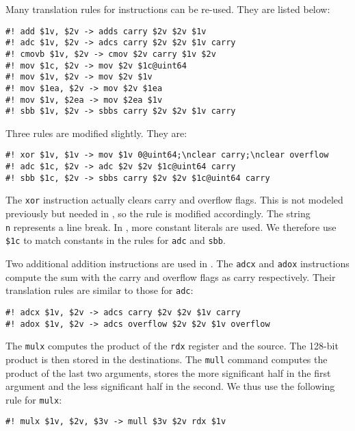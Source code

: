 \documentclass{amsproc}
\begin{document}
Many translation rules for \xeightysix instructions can be
re-used. They are listed below:
\begin{verbatim}
#! add $1v, $2v -> adds carry $2v $2v $1v
#! adc $1v, $2v -> adcs carry $2v $2v $1v carry
#! cmovb $1v, $2v -> cmov $2v carry $1v $2v
#! mov $1c, $2v -> mov $2v $1c@uint64
#! mov $1v, $2v -> mov $2v $1v
#! mov $1ea, $2v -> mov $2v $1ea
#! mov $1v, $2ea -> mov $2ea $1v
#! sbb $1v, $2v -> sbbs carry $2v $2v $1v carry
\end{verbatim}

Three rules are modified slightly. They are:
\begin{verbatim}
#! xor $1v, $1v -> mov $1v 0@uint64;\nclear carry;\nclear overflow
#! adc $1c, $2v -> adc $2v $2v $1c@uint64 carry
#! sbb $1c, $2v -> sbbs carry $2v $2v $1c@uint64 carry
\end{verbatim}
The \xeightysix \texttt{xor} instruction actually clears carry and
overflow flags. This is not modeled previously but needed in
\nistzmul, so the rule is modified accordingly. The string
\texttt{\\n} represents a line break. In \nistzmul, more
constant literals are used. We therefore use \texttt{\$1c} to match
constants in the rules for \texttt{adc} and \texttt{sbb}.

Two additional addition instructions are used in \nistzmul. The
\texttt{adcx} and \texttt{adox} instructions compute the sum with the
carry and overflow flags as carry respectively. Their translation
rules are similar to those for \texttt{adc}:
\begin{verbatim}
#! adcx $1v, $2v -> adcs carry $2v $2v $1v carry
#! adox $1v, $2v -> adcs overflow $2v $2v $1v overflow
\end{verbatim}

The \xeightysix \texttt{mulx} computes the product of the \texttt{rdx}
register and the source. The 128-bit product is then stored in the
destinations. The \cryptoline \texttt{mull} command computes the
product of the last two arguments, stores the more significant half
in the first argument and the less significant half in the second. We
thus use the following rule for \texttt{mulx}:
\begin{verbatim}
#! mulx $1v, $2v, $3v -> mull $3v $2v rdx $1v
\end{verbatim}
\end{document}
